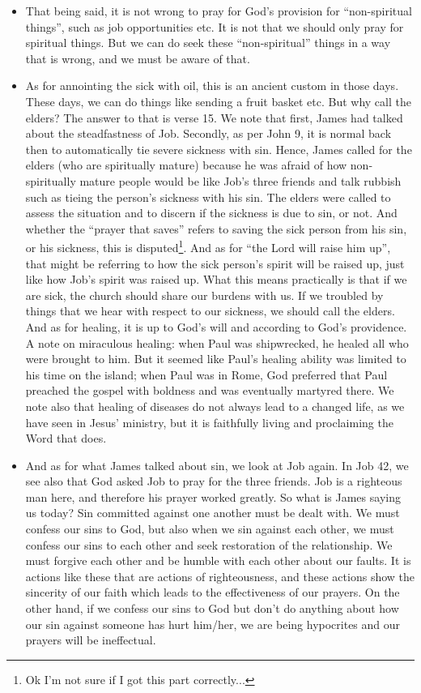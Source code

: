 \begin{itemize}
  \item{That being said, it is not wrong to pray for God's provision for
  ``non-spiritual things'', such as job opportunities etc.  It is not that we
  should only pray for spiritual things.  But we can do seek these
  ``non-spiritual'' things in a way that is wrong, and we must be aware of
  that.}
  \item{As for annointing the sick with oil, this is an ancient custom in
  those days.  These days, we can do things like sending a fruit basket etc.
  But why call the elders?  The answer to that is verse 15.  We note that
  first, James had talked about the steadfastness of Job.  Secondly, as per
  John 9, it is normal back then to automatically tie severe sickness with
  sin.  Hence, James called for the elders (who are spiritually mature)
  because he was afraid of how non-spiritually mature people would be like
  Job's three friends and talk rubbish such as tieing the person's sickness
  with his sin.  The elders were called to assess the situation and to
  discern if the sickness is due to sin, or not.  And whether the ``prayer
  that saves'' refers to saving the sick person from his sin, or his
  sickness, this is disputed\footnote{Ok I'm not sure if I got this part
  correctly...}.  And as for ``the Lord will raise him up'', that might be
  referring to how the sick person's spirit will be raised up, just like how
  Job's spirit was raised up.  What this means practically is that if we are
  sick, the church should share our burdens with us.  If we troubled by
  things that we hear with respect to our sickness, we should call the
  elders.  And as for healing, it is up to God's will and according to God's
  providence.  A note on miraculous healing: when Paul was shipwrecked, he
  healed all who were brought to him.  But it seemed like Paul's healing
  ability was limited to his time on the island; when Paul was in Rome, God
  preferred that Paul preached the gospel with boldness and was eventually
  martyred there.  We note also that healing of diseases do not always lead
  to a changed life, as we have seen in Jesus' ministry, but it is faithfully
  living and proclaiming the Word that does.}
  \item{And as for what James talked about sin, we look at Job again.  In Job
  42, we see also that God asked Job to pray for the three friends.  Job is a
  righteous man here, and therefore his prayer worked greatly.  So what is
  James saying us today?  Sin committed against one another must be dealt
  with.  We must confess our sins to God, but also when we sin against each
  other, we must confess our sins to each other and seek restoration of the
  relationship.  We must forgive each other and be humble with each other
  about our faults.  It is actions like these that are actions of
  righteousness, and these actions show the sincerity of our faith which
  leads to the effectiveness of our prayers.  On the other hand, if we
  confess our sins to God but don't do anything about how our sin against
  someone has hurt him/her, we are being hypocrites and our prayers will be
  ineffectual.  }
\end{itemize}